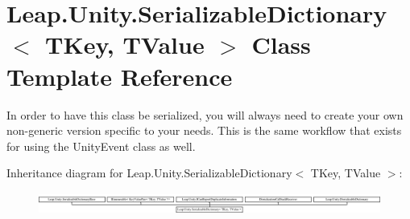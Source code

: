 \hypertarget{class_leap_1_1_unity_1_1_serializable_dictionary}{}\section{Leap.\+Unity.\+Serializable\+Dictionary$<$ T\+Key, T\+Value $>$ Class Template Reference}
\label{class_leap_1_1_unity_1_1_serializable_dictionary}


In order to have this class be serialized, you will always need to create your own non-\/generic version specific to your needs. This is the same workflow that exists for using the Unity\+Event class as well.  


Inheritance diagram for Leap.\+Unity.\+Serializable\+Dictionary$<$ T\+Key, T\+Value $>$\+:\begin{figure}[H]
\begin{center}
\leavevmode
\includegraphics[height=0.722581cm]{class_leap_1_1_unity_1_1_serializable_dictionary}
\end{center}
\end{figure}
